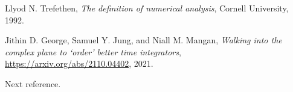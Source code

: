 \providecommand{\bysame}{\leavevmode\hbox to3em{\hrulefill}\thinspace}
\providecommand{\href}[2]{#2}
\begin{thebibliography}{1}

Llyod N. Trefethen, \emph{{T}he definition of numerical analysis}, Cornell University, 1992.

Jithin D. George, Samuel Y. Jung, and Niall M. Mangan, \emph{{W}alking into the complex plane to `order' better time integrators}, \url{https://arxiv.org/abs/2110.04402}, 2021.

Next reference.

\end{thebibliography}
